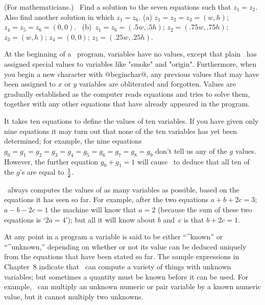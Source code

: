 {{{{\dangerexercise (For mathematicians.) \ Find a solution to the seven
equations such that $z_1=z_2$. Also find another solution in which
$z_1=z_6$.
\answer (a) $z_1=z_2=z_3=(w,h)$; $z_4=z_5=z_6=(0,0)$.
\ (b)~$z_1=z_6=(.5w,.5h)$; $z_2=(.75w,.75h)$; $z_3=(w,h)$;
$z_4=(0,0)$; $z_5=(.25w,.25h)$.

At the beginning of a \MF\ program, variables have no values,
except that plain \MF\ has assigned special values to variables
like "smoke" and "origin". Furthermore, when you begin a new
character with @beginchar@, any previous values that may have been
assigned to $x$ or $y$ variables are obliterated and forgotten.
Values are gradually established as the computer reads equations and
tries to solve them, together with any other equations that have already
appeared in the program.

It takes ten equations to define the values of ten variables.
If you have given only nine equations it may turn out that none of
the ten variables has yet been determined; for example, the
nine equations
\begindisplay
$g_0=g_1=g_2=g_3=g_4=g_5=g_6=g_7=g_8=g_9$
\enddisplay
don't tell us any of the $g$ values. However, the further equation
\begindisplay
$g_0+g_1=1$
\enddisplay
will cause \MF\ to deduce that all ten of the $g$'s are equal to $1\over2$.

\MF\ always computes the values of as many variables as possible, based
on the equations it has seen so far. For example, after the two equations
\begindisplay
$a+b+2c=3$;\cr
$a-b-2c=1$\cr
\enddisplay
the machine will know that $a=2$ (because the sum of these two equations is
`$2a=4$'); but all it will know about $b$ and~$c$ is that $b+2c=1$.

At any point in a program a variable is said to be either ``^{known}''
or ``^{unknown},'' depending on whether or not its value can be
deduced uniquely from the equations that have been stated so far.
The sample expressions in Chapter~8 indicate that \MF\ can compute a
variety of things with unknown variables; but sometimes a quantity
must be known before it can be used. For example, \MF\ can multiply
an unknown numeric or pair variable by a known numeric value, but it
cannot multiply two unknowns.

}}}}
